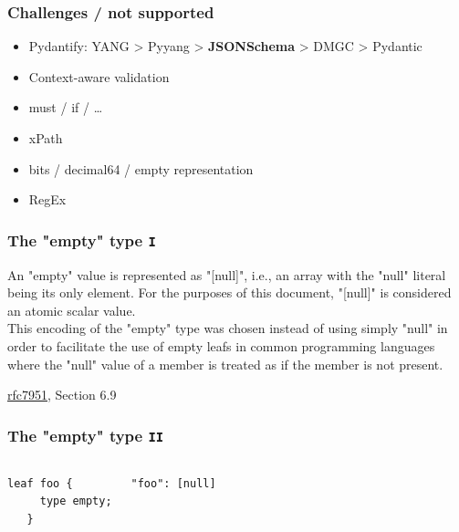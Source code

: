 \documentclass[aspectratio=169]{beamer}
\begin{document}
\begin{frame}
  \frametitle{Challenges / not supported}
  \begin{itemize}
    \setlength\itemsep{1em}
    \item Pydantify: YANG > Pyyang > \textbf{JSONSchema} > DMGC > Pydantic
    \item Context-aware validation
    \item must / if / \dots
    \item xPath
    \item bits / decimal64 / empty representation
    \item RegEx
  \end{itemize}
\end{frame}


\begin{frame}
  \frametitle{The "empty" type \texttt{I}}
      \begin{itshape}
   An "empty" value is represented as "[null]", i.e., an array with the
   "null" literal being its only element.  For the purposes of this
   document, "[null]" is considered an atomic scalar value.
\\

   This encoding of the "empty" type was chosen instead of using simply
   "null" in order to facilitate the use of empty leafs in common
   programming languages where the "null" value of a member is treated
   as if the member is not present.
      \end{itshape}
    \begin{flushright}
        \underline{rfc7951}, Section 6.9
    \end{flushright}
\end{frame}

\begin{frame}[fragile]
  \frametitle{The "empty" type \texttt{II}}

  \begin{columns}
        \begin{verbatim}
leaf foo {
     type empty;
   }
\end{verbatim}
        \begin{verbatim}
"foo": [null]
\end{verbatim}
    \end{columns}
\end{frame}
\end{document}
